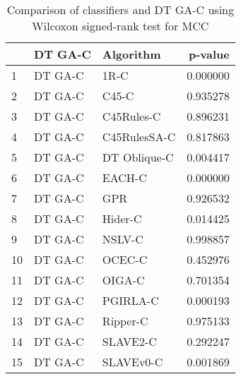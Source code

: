 \begin{table}
\footnotesize
\caption{Comparison of classifiers and DT GA-C using Wilcoxon signed-rank test for MCC}
\label{tab:DT GA-C wilcoxon MCC comparison}
\begin{tabular}{lllr}
\hline
 & DT GA-C & Algorithm & p-value \\
\hline
1 & DT GA-C & 1R-C & 0.000000 \\
2 & DT GA-C & C45-C & 0.935278 \\
3 & DT GA-C & C45Rules-C & 0.896231 \\
4 & DT GA-C & C45RulesSA-C & 0.817863 \\
5 & DT GA-C & DT Oblique-C & 0.004417 \\
6 & DT GA-C & EACH-C & 0.000000 \\
7 & DT GA-C & GPR & 0.926532 \\
8 & DT GA-C & Hider-C & 0.014425 \\
9 & DT GA-C & NSLV-C & 0.998857 \\
10 & DT GA-C & OCEC-C & 0.452976 \\
11 & DT GA-C & OIGA-C & 0.701354 \\
12 & DT GA-C & PGIRLA-C & 0.000193 \\
13 & DT GA-C & Ripper-C & 0.975133 \\
14 & DT GA-C & SLAVE2-C & 0.292247 \\
15 & DT GA-C & SLAVEv0-C & 0.001869 \\
\hline
\end{tabular}
\end{table}
